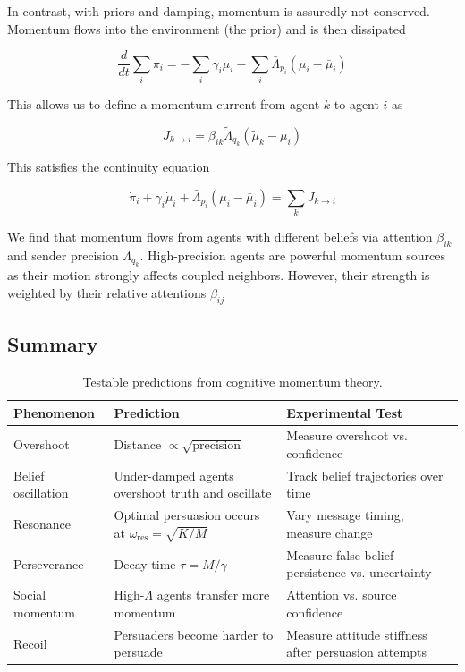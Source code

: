 \documentclass[12pt]{article}
\begin{document}
In contrast,  with priors and damping, momentum is assuredly not conserved. Momentum flows into the environment (the prior) and is then dissipated

\begin{equation}
\frac{d}{dt}\sum_i \pi_i = -\sum_i\gamma_i\dot{\mu}_i - \sum_i\bar{\Lambda}_{p_i}(\mu_i - \bar{\mu}_i)
\end{equation}


This allows us to define a momentum current from agent $k$ to agent $i$ as

\begin{equation}
J_{k\rightarrow i} = \beta_{ik}\tilde{\Lambda}_{q_k}(\tilde{\mu}_k - \mu_i)
\end{equation}

This satisfies the continuity equation

\begin{equation}
\dot{\pi}_i + \gamma_i\dot{\mu}_i + \bar{\Lambda}_{p_i}(\mu_i - \bar{\mu}_i) = \sum_k J_{k\rightarrow i}
\end{equation}

We find that momentum flows from agents with different beliefs via attention $\beta_{ik}$ and sender precision $\Lambda_{q_k}$. High-precision agents are powerful momentum sources as their motion strongly affects coupled neighbors. However, their strength is weighted by their relative attentions $\beta_{ij}$

\subsection{Summary}

\begin{table}[ht]
\centering
\caption{Testable predictions from cognitive momentum theory.}
\label{tab:predictions}
\renewcommand{\arraystretch}{1.3}
\begin{tabular}{@{} p{3cm} p{5cm} p{5cm} @{}}
\toprule
\textbf{Phenomenon} & \textbf{Prediction} & \textbf{Experimental Test} \\
\midrule
Overshoot & Distance $\propto \sqrt{\text{precision}}$ & Measure overshoot vs. confidence \\[6pt]
Belief oscillation & Under-damped agents overshoot truth and oscillate & Track belief trajectories over time \\[6pt]
Resonance & Optimal persuasion occurs at $\omega_{\text{res}} = \sqrt{K/M}$ & Vary message timing, measure change \\[6pt]
Perseverance & Decay time $\tau = M/\gamma$ & Measure false belief persistence vs. uncertainty \\[6pt]
Social momentum & High-$\Lambda$ agents transfer more momentum & Attention vs. source confidence \\[6pt]
Recoil & Persuaders become harder to persuade & Measure attitude stiffness after persuasion attempts \\
\bottomrule
\end{tabular}
\end{table}
\end{document}
